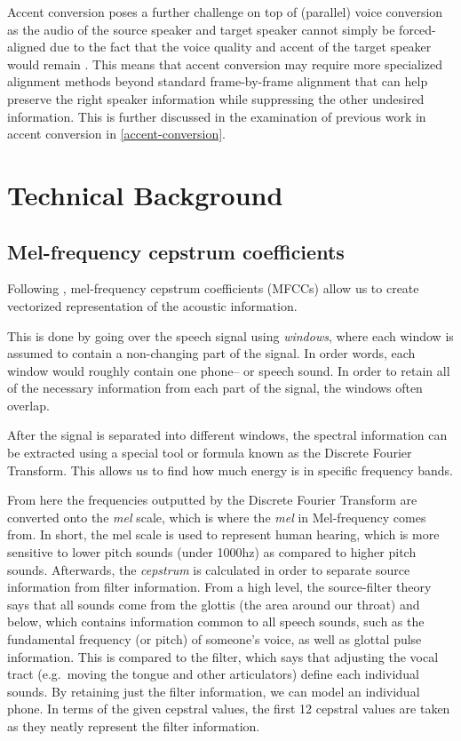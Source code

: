 \documentclass
[
    a4paper,
    twoside,
    12pt,
]
{report}
\begin{document}
Accent conversion poses a further challenge on top of (parallel) voice
conversion as the audio of the source speaker and target speaker cannot
simply be forced-aligned due to the fact that the voice quality and
accent of the target speaker would remain \parencite{aryal2014}. This
means that accent conversion may require more specialized alignment
methods beyond standard frame-by-frame alignment that can help preserve
the right speaker information while suppressing the other undesired
information. This is further discussed in the examination of previous
work in accent conversion in \autoref{accent-conversion}.

\hypertarget{technical-background}{%
\section{Technical Background}\label{technical-background}}

\subsection{Mel-frequency cepstrum coefficients}

Following \textcite{jurafsky2009}, mel-frequency cepstrum coefficients
(MFCCs) allow us to create vectorized representation of the acoustic
information.

This is done by going over the speech signal using \emph{windows}, where
each window is assumed to contain a non-changing part of the signal. In
order words, each window would roughly contain one phone-- or speech
sound. In order to retain all of the necessary information from each
part of the signal, the windows often overlap.

After the signal is separated into different windows, the spectral
information can be extracted using a special tool or formula known as
the Discrete Fourier Transform. This allows us to find how much energy
is in specific frequency bands.

From here the frequencies outputted by the Discrete Fourier Transform
are converted onto the \emph{mel} scale, which is where the \emph{mel}
in Mel-frequency comes from. In short, the mel scale is used to
represent human hearing, which is more sensitive to lower pitch sounds
(under 1000hz) as compared to higher pitch sounds. Afterwards, the
\emph{cepstrum} is calculated in order to separate source information
from filter information. From a high level, the source-filter theory
says that all sounds come from the glottis (the area around our throat)
and below, which contains information common to all speech sounds, such
as the fundamental frequency (or pitch) of someone's voice, as well as
glottal pulse information. This is compared to the filter, which says
that adjusting the vocal tract (e.g.~moving the tongue and other
articulators) define each individual sounds. By retaining just the
filter information, we can model an individual phone. In terms of the
given cepstral values, the first 12 cepstral values are taken as they
neatly represent the filter information.
\end{document}
